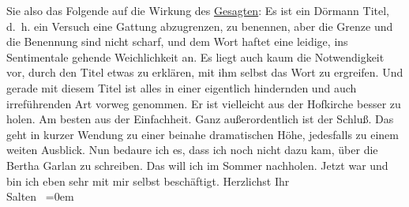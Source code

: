 \begin{ledgroupsized}[t]{13cm}
               Sie also das Folgende auf die Wirkung des \uline{Gesagten}:
               Es ist ein Dörmann Titel, d. h. ein Versuch
               eine Gattung abzugrenzen, zu benennen, aber die Grenze und die Benennung sind nicht
               scharf, und dem Wort haftet eine leidige, ins Sentimentale gehende Weichlichkeit an.
               Es liegt auch kaum die Notwendigkeit vor, durch den Titel etwas zu erklären, mit ihm
               selbst das Wort zu ergreifen. Und gerade mit diesem Titel ist alles in einer
               eigentlich hindernden und auch irreführenden Art vorweg genommen. Er ist vielleicht
               aus der Hofkirche besser zu holen. Am besten
               aus der Einfachheit. Ganz außerordentlich ist der Schluß. Das geht in kurzer Wendung
                  {\pb}zu einer beinahe
               dramatischen Höhe, jedesfalls zu einem weiten Ausblick. Nun bedaure ich es, dass ich
               noch nicht dazu kam, über die Bertha Garlan zu
               schreiben. Das will ich im Sommer nachholen. Jetzt war und bin ich eben sehr mit mir
               selbst beschäftigt. \pend
           \pstart
           Herzlichst Ihr {\\[\baselineskip]}\spacefill\mbox{Salten }\pend
           \leftskip=0em{}
         
         \endnumbering{}\end{ledgroupsized}\begin{anhang}\end{anhang}\newcommand{\dateiname}{L03330}\newcommand{\titel}{Felix Salten an Arthur Schnitzler, 22. 5. 1902}\newcommand{\editorInnen}{Martin Anton Müller und Laura Untner}
      